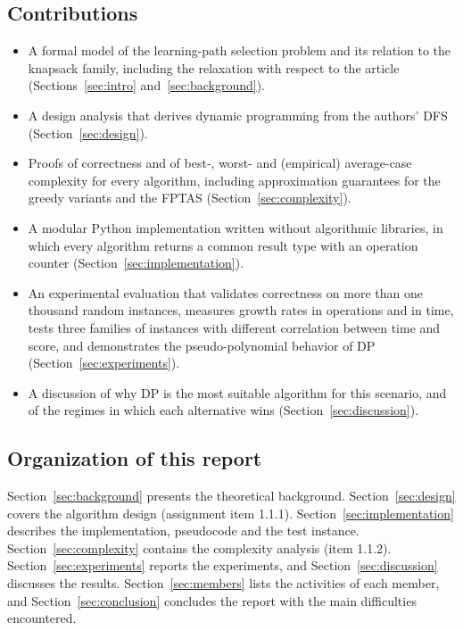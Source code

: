 \subsection{Contributions}

\begin{itemize}[leftmargin=1.4em,itemsep=2pt]
\item A formal model of the learning-path selection problem and its relation to the knapsack family, including the relaxation with respect to the article (Sections~\ref{sec:intro} and~\ref{sec:background}).
\item A design analysis that derives dynamic programming from the authors' DFS (Section~\ref{sec:design}).
\item Proofs of correctness and of best-, worst- and (empirical) average-case complexity for every algorithm, including approximation guarantees for the greedy variants and the FPTAS (Section~\ref{sec:complexity}).
\item A modular Python implementation written without algorithmic libraries, in which every algorithm returns a common result type with an operation counter (Section~\ref{sec:implementation}).
\item An experimental evaluation that validates correctness on more than one thousand random instances, measures growth rates in operations and in time, tests three families of instances with different correlation between time and score, and demonstrates the pseudo-polynomial behavior of DP (Section~\ref{sec:experiments}).
\item A discussion of why DP is the most suitable algorithm for this scenario, and of the regimes in which each alternative wins (Section~\ref{sec:discussion}).
\end{itemize}

\subsection{Organization of this report}

Section~\ref{sec:background} presents the theoretical background. Section~\ref{sec:design} covers the algorithm design (assignment item 1.1.1). Section~\ref{sec:implementation} describes the implementation, pseudocode and the test instance. Section~\ref{sec:complexity} contains the complexity analysis (item 1.1.2). Section~\ref{sec:experiments} reports the experiments, and Section~\ref{sec:discussion} discusses the results. Section~\ref{sec:members} lists the activities of each member, and Section~\ref{sec:conclusion} concludes the report with the main difficulties encountered.
